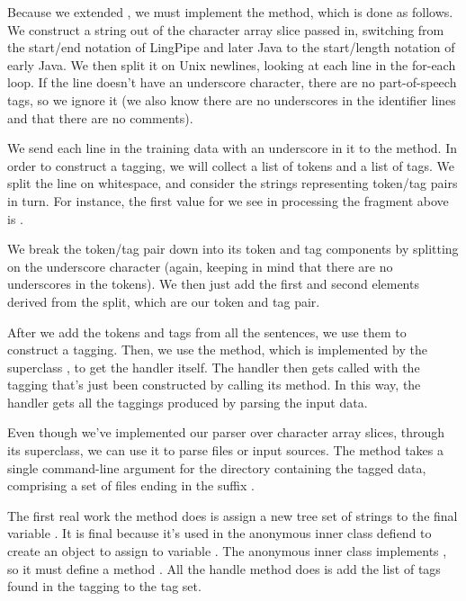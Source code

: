 Because we extended , we must implement the
 method, which is done as follows.
%
%
We construct a string out of the character array slice passed in,
switching from the start/end notation of LingPipe and later Java to
the start/length notation of early Java.  We then split it on Unix
newlines, looking at each line in the for-each loop.  If the line
doesn't have an underscore character, there are no part-of-speech
tags, so we ignore it (we also know there are no underscores in the
identifier lines and that there are no comments).  

We send each line in the training data with an underscore in it to the
 method.
%
%
In order to construct a tagging, we will collect a list of tokens and
a list of tags.  We split the line on whitespace, and consider the
strings representing token/tag pairs in turn.   For instance, the
first value for  we see in processing the fragment above
is .  

We break the token/tag pair down into its token and tag components by
splitting on the underscore character (again, keeping in mind that
there are no underscores in the tokens).  We then just add the first
and second elements derived from the split, which are our token and
tag pair.

After we add the tokens and tags from all the sentences, we use them
to construct a tagging.  Then, we use the  method,
which is implemented by the superclass , to get the
handler itself.  The handler then gets called with the tagging
that's just been constructed by calling its 
method.  In this way, the handler gets all the taggings produced
by parsing the input data.

Even though we've implemented our parser over character array slices,
through its superclass, we can use it to parse files or input sources.
The  method takes a single command-line argument for
the directory containing the tagged data, comprising a set of
files ending in the suffix .  

The first real work the method does is assign a new tree set of
strings to the final variable . 
%
%
It is final because it's used in the anonymous inner class defiend to
create an object to assign to variable .  The anonymous
inner class implements , so it
must define a method .  All the handle
method does is add the list of tags found in the tagging to the tag
set.

